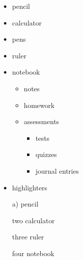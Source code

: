 \documentclass[11pt]{article}
\begin{document}
\vspace{1cm}

\begin{itemize}

	\item pencil
	\item calculator
	\item pens
	\item ruler
	\item notebook
		\begin{itemize}
		\item notes
		\item homework
		\item assessments
			\begin{itemize}
			\item tests
			\item quizzes
			\item journal entries
			\end{itemize}
		\end{itemize}			

	\item highlighters

\end{itemize}

\vspace{1cm}

\begin{enumerate}

	\item[a)] pencil
	\item[two] calculator
	\item[three] ruler
	\item[four] notebook	
\end{enumerate}
\end{document}
